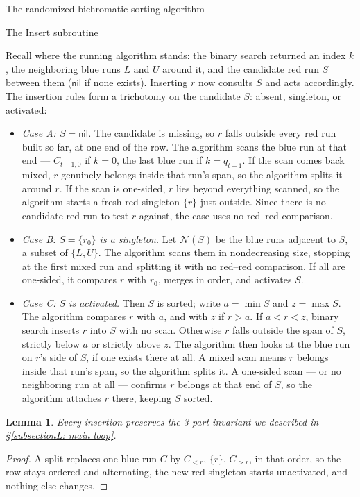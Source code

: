 \documentclass[11pt]{article}
\newcommand{\nil}{\textsf{nil}}
\newtheorem{lem}[thm]{Lemma}
\theoremstyle{definition}
\numberwithin{equation}{section}
\begin{document}
\begin{section}{The randomized bichromatic sorting algorithm}
\begin{subsection}{The {\ttfamily Insert} subroutine}
\begin{aiblock}
Recall where the running algorithm stands: the binary search
returned an index $k$, the neighboring blue runs $L$ and $U$ around
it, and the candidate red run $S$ between them ($\nil$ if none
exists). Inserting $r$ now consults $S$ and acts accordingly. The
insertion rules form a trichotomy on the candidate $S$: absent,
singleton, or activated:
\begin{itemize}[{}]
\item
{\em Case A: $S = \nil$.} The candidate is missing, so $r$ falls
outside every red run built so far, at one end of the row. The
algorithm scans the blue run at that end --- $C_{t-1,0}$ if $k = 0$,
the last blue run if $k = q_{t-1}$. If the scan comes back mixed,
$r$ genuinely belongs inside that run's span, so the algorithm
splits it around $r$. If the scan is one-sided, $r$ lies beyond
everything scanned, so the algorithm starts a fresh red singleton
$\{r\}$ just outside. Since there is no candidate red run to test
$r$ against, the case uses no red--red comparison.
\item
{\em Case B: $S = \{r_0\}$ is a singleton.} Let $\mathcal N(S)$ be
the blue runs adjacent to $S$, a subset of $\{L, U\}$. The
algorithm scans them in nondecreasing size, stopping at the first
mixed run and splitting it with no red--red comparison. If all
are one-sided, it compares $r$ with $r_0$, merges in order, and
activates $S$.
\item
{\em Case C: $S$ is activated.} Then $S$ is sorted; write
$a = \min S$ and $z = \max S$. The algorithm compares $r$ with $a$,
and with $z$ if $r > a$. If $a < r < z$, binary search inserts $r$
into $S$ with no scan. Otherwise $r$ falls outside the span of $S$, strictly below $a$ or
strictly above $z$. The algorithm then looks at the blue run on
$r$'s side of $S$, if one exists there at all. A mixed scan means
$r$ belongs inside that run's span, so the algorithm splits it. A
one-sided scan --- or no neighboring run at all --- confirms $r$
belongs at that end of $S$, so the algorithm attaches $r$ there,
keeping $S$ sorted.
\end{itemize}

\begin{lem}\label{lem:invariant}
Every insertion preserves the 3-part invariant we described in \S\ref{subsectionL: main loop}.
\end{lem}
\begin{proof}
A split replaces one blue run $C$ by $C_{<r}$, $\{r\}$, $C_{>r}$,
in that order, so the row stays ordered and alternating, the new
red singleton starts unactivated, and nothing else changes.


\end{proof}
\end{aiblock}
\end{subsection}
\end{section}
\end{document}
